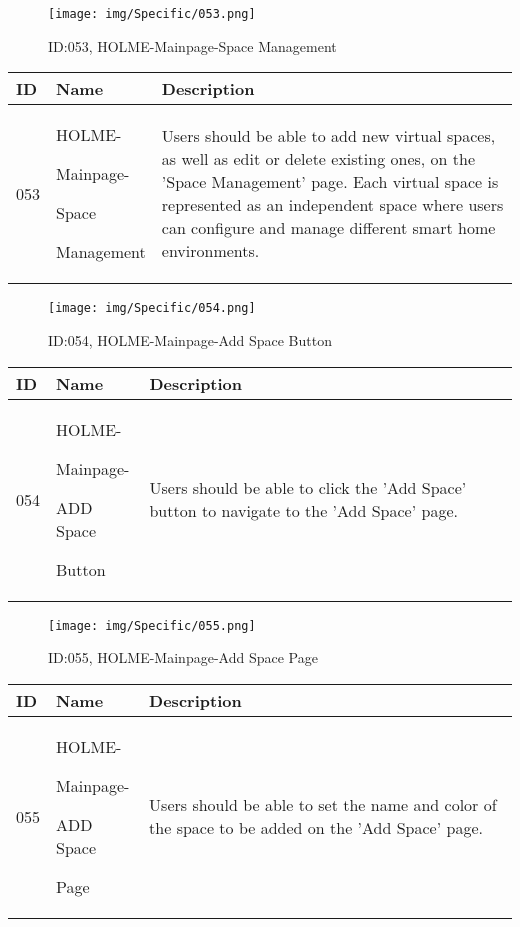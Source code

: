 \documentclass[conference]{IEEEtran}
\begin{document}
\begin{enumerate}
\begin{figure}[h]
\centering
\texttt{[image: img/Specific/053.png]}
\caption{ID:053, HOLME-Mainpage-Space Management}
\end{figure}
\begin{table}[h]
\def\arraystretch{1.2} \small
    \begin{tabular}{|p{1cm}|p{1.8cm}|p{5.0cm}|}
        \hline
        ID & Name & Description\\ \hline
         053 \par  & HOLME-\par Mainpage-\par Space \par Management &Users should be able to add new virtual spaces, as well as edit or delete existing ones, on the 'Space Management' page. Each virtual space is represented as an independent space where users can configure and manage different smart home environments.\\ \hline
    \end{tabular}
\end{table}
\clearpage

\begin{figure}[h]
\centering
\texttt{[image: img/Specific/054.png]}
\caption{ID:054, HOLME-Mainpage-Add Space Button }
\end{figure}
\begin{table}[h]
\def\arraystretch{1.2} \small
    \begin{tabular}{|p{1cm}|p{1.8cm}|p{5.0cm}|}
        \hline
        ID & Name & Description\\ \hline
         054 \par  & HOLME-\par Mainpage-\par ADD Space \par Button &Users should be able to click the 'Add Space' button to navigate to the 'Add Space' page.\\ \hline
    \end{tabular}
\end{table}

\begin{figure}[h]
\centering
\texttt{[image: img/Specific/055.png]}
\caption{ID:055, HOLME-Mainpage-Add Space Page}
\end{figure}
\begin{table}[h]
\def\arraystretch{1.2} \small
    \begin{tabular}{|p{1cm}|p{1.8cm}|p{5.0cm}|}
        \hline
        ID & Name & Description\\ \hline
         055 \par  & HOLME-\par Mainpage-\par ADD Space\par Page  &Users should be able to set the name and color of the space to be added on the 'Add Space' page.\\ \hline
    \end{tabular}
\end{table}


\end{enumerate}
\end{document}
